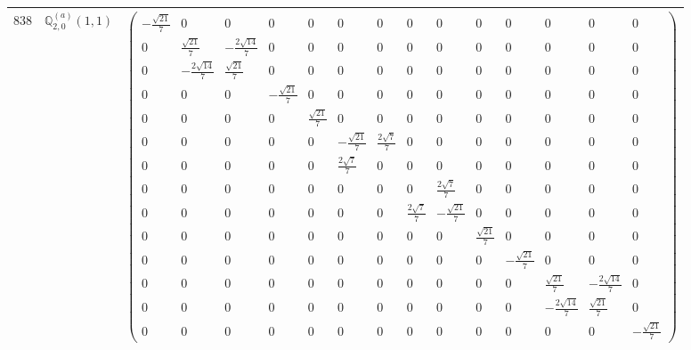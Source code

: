 \documentclass[fleqn,8pt,landscape]{jsarticle}
\begin{document}
\begin{center}
\begin{longtable}{ccc}
$ 838 $ & $ \mathbb{Q}_{2,0}^{(a)}(1,1) $ & $ \begin{pmatrix} - \frac{\sqrt{21}}{7} & 0 & 0 & 0 & 0 & 0 & 0 & 0 & 0 & 0 & 0 & 0 & 0 & 0 \\ 0 & \frac{\sqrt{21}}{7} & - \frac{2 \sqrt{14}}{7} & 0 & 0 & 0 & 0 & 0 & 0 & 0 & 0 & 0 & 0 & 0 \\ 0 & - \frac{2 \sqrt{14}}{7} & \frac{\sqrt{21}}{7} & 0 & 0 & 0 & 0 & 0 & 0 & 0 & 0 & 0 & 0 & 0 \\ 0 & 0 & 0 & - \frac{\sqrt{21}}{7} & 0 & 0 & 0 & 0 & 0 & 0 & 0 & 0 & 0 & 0 \\ 0 & 0 & 0 & 0 & \frac{\sqrt{21}}{7} & 0 & 0 & 0 & 0 & 0 & 0 & 0 & 0 & 0 \\ 0 & 0 & 0 & 0 & 0 & - \frac{\sqrt{21}}{7} & \frac{2 \sqrt{7}}{7} & 0 & 0 & 0 & 0 & 0 & 0 & 0 \\ 0 & 0 & 0 & 0 & 0 & \frac{2 \sqrt{7}}{7} & 0 & 0 & 0 & 0 & 0 & 0 & 0 & 0 \\ 0 & 0 & 0 & 0 & 0 & 0 & 0 & 0 & \frac{2 \sqrt{7}}{7} & 0 & 0 & 0 & 0 & 0 \\ 0 & 0 & 0 & 0 & 0 & 0 & 0 & \frac{2 \sqrt{7}}{7} & - \frac{\sqrt{21}}{7} & 0 & 0 & 0 & 0 & 0 \\ 0 & 0 & 0 & 0 & 0 & 0 & 0 & 0 & 0 & \frac{\sqrt{21}}{7} & 0 & 0 & 0 & 0 \\ 0 & 0 & 0 & 0 & 0 & 0 & 0 & 0 & 0 & 0 & - \frac{\sqrt{21}}{7} & 0 & 0 & 0 \\ 0 & 0 & 0 & 0 & 0 & 0 & 0 & 0 & 0 & 0 & 0 & \frac{\sqrt{21}}{7} & - \frac{2 \sqrt{14}}{7} & 0 \\ 0 & 0 & 0 & 0 & 0 & 0 & 0 & 0 & 0 & 0 & 0 & - \frac{2 \sqrt{14}}{7} & \frac{\sqrt{21}}{7} & 0 \\ 0 & 0 & 0 & 0 & 0 & 0 & 0 & 0 & 0 & 0 & 0 & 0 & 0 & - \frac{\sqrt{21}}{7} \end{pmatrix} $ \\ \hline

\end{longtable}
\end{center}
\end{document}
